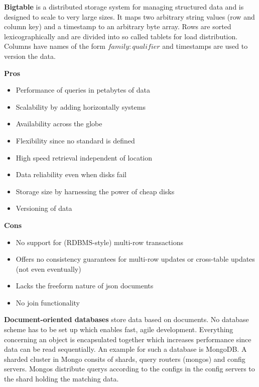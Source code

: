 \textbf{Bigtable} is a distributed storage system for managing structured data and is designed to scale to very large sizes.
It maps two arbitrary string values (row and column key) and a timestamp to an arbitrary byte array.
Rows are sorted lexicographically and are divided into so called tablets for load distribution.
Columns have names of the form $family:qualifier$ and timestamps are used to version the data.\\
\begin{minipage}[t]{0.49\textwidth}
  \textbf{Pros}
  \begin{itemize}[topsep=0pt,noitemsep]
    \item Performance of queries in petabytes of data
    \item Scalability by adding horizontally systems
    \item Availability across the globe
    \item Flexibility since no standard is defined
    \item High speed retrieval independent of location
    \item Data reliability even when disks fail
    \item Storage size by harnessing the power of cheap disks
    \item Versioning of data
  \end{itemize}
\end{minipage}
\begin{minipage}[t]{0.49\textwidth}
  \textbf{Cons}
  \begin{itemize}[topsep=0pt, noitemsep]
    \item No support for (RDBMS-style) multi-row transactions
    \item Offers no consistency guarantees for multi-row updates or cross-table updates (not even eventually)
    \item Lacks the freeform nature of json documents
    \item No join functionality
  \end{itemize}
\end{minipage}
\vspace{20pt}

\textbf{Document-oriented databases} store data based on documents.
No database scheme has to be set up which enables fast, agile development.
Everything concerning an object is encapsulated together which increases performance since data can be read sequentially.
An example for such a database is MongoDB\@.
A sharded cluster in Mongo consits of shards, query routers (mongos) and config servers.
Mongos distribute querys according to the configs in the config servers to the shard holding the matching data.\\

